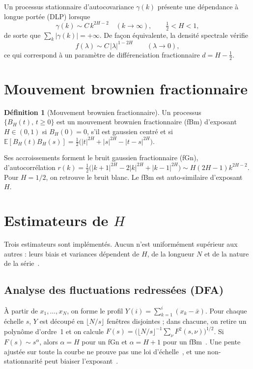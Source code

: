 \documentclass[12pt,a4paper]{report}
\theoremstyle{definition}
\newtheorem{definition}{Définition}[chapter]
\newcommand{\E}{\mathbb{E}}
\begin{document}
Un processus stationnaire d'autocovariance $\gamma(k)$ présente une dépendance à longue
portée (DLP) lorsque
\[
  \gamma(k)\sim C\,k^{2H-2}\quad(k\to\infty),\qquad \tfrac12<H<1,
\]
de sorte que $\sum_k|\gamma(k)|=+\infty$. De façon équivalente, la densité spectrale vérifie
\begin{equation}
  f(\lambda)\sim C\,|\lambda|^{1-2H}\qquad(\lambda\to0),
  \label{eq:spectre}
\end{equation}
ce qui correspond à un paramètre de différenciation fractionnaire $d=H-\tfrac12$.

\section{Mouvement brownien fractionnaire}

\begin{definition}[Mouvement brownien fractionnaire]
Un processus $\{B_H(t),\,t\ge0\}$ est un mouvement brownien fractionnaire (fBm)
d'exposant $H\in(0,1)$ si $B_H(0)=0$, s'il est gaussien centré et si
$\E[B_H(t)B_H(s)]=\tfrac12\bigl(|t|^{2H}+|s|^{2H}-|t-s|^{2H}\bigr)$.
\end{definition}

Ses accroissements forment le bruit gaussien fractionnaire (fGn), d'autocorrélation
$r(k)=\tfrac12\bigl(|k+1|^{2H}-2|k|^{2H}+|k-1|^{2H}\bigr)\sim H(2H-1)k^{2H-2}$. Pour
$H=1/2$, on retrouve le bruit blanc. Le fBm est auto-similaire d'exposant~$H$.

\section{Estimateurs de $H$}

Trois estimateurs sont implémentés. Aucun n'est uniformément supérieur aux autres : leurs
biais et variances dépendent de $H$, de la longueur $N$ et de la nature de la
série~\cite{katsev2003,weron2002}.

\subsection{Analyse des fluctuations redressées (DFA)}

À partir de $x_1,\dots,x_N$, on forme le profil $Y(i)=\sum_{k=1}^{i}(x_k-\bar x)$. Pour
chaque échelle $s$, $Y$ est découpé en $\lfloor N/s\rfloor$ fenêtres disjointes ; dans
chacune, on retire un polynôme d'ordre~1 et on calcule
$F(s)=\bigl(\lfloor N/s\rfloor^{-1}\sum_\nu F^2(s,\nu)\bigr)^{1/2}$. Si
$F(s)\sim s^{\alpha}$, alors $\alpha=H$ pour un fGn et $\alpha=H+1$ pour un
fBm~\cite{peng1994}. Une pente ajustée sur toute la courbe ne prouve pas une loi
d'échelle~\cite{maraun2004}, et une non-stationnarité peut biaiser l'exposant~\cite{chen2002}.
\end{document}

